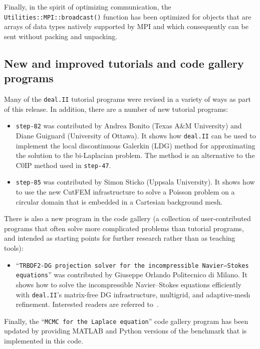 \documentclass{ansarticle-preprint}
\newcommand{\specialword}[1]{\texttt{#1}}
\newcommand{\dealii}{{\specialword{deal.II}}\xspace}
\begin{document}
Finally, in the spirit of optimizing communication, the
\texttt{Utilities::MPI::broadcast()} function has been optimized for
objects that are arrays of data types natively supported by MPI and
which consequently can be sent without packing and unpacking.





\subsection{New and improved tutorials and code gallery programs}
\label{subsec:steps}

Many of the \dealii{} tutorial programs were revised in a variety of
ways as part of this release. In addition, there are a number of new tutorial programs:
\begin{itemize}
\item \texttt{step-82} was contributed by Andrea Bonito (Texas A\&M University) and Diane Guignard (University of Ottawa). It shows how
\dealii{} can be used to implement the
local discontinuous Galerkin (LDG) method for approximating the
solution to the bi-Laplacian problem. The method is an alternative to
the C0IP method used in \texttt{step-47}.

\item \texttt{step-85} was contributed by Simon Sticko (Uppsala University). It shows how to use the new CutFEM infrastructure to solve a Poisson
problem on a circular domain that is embedded in a Cartesian background mesh.
\end{itemize}

There is also a new program in the code gallery (a collection of
user-contributed programs that often solve more complicated problems
than tutorial programs, and intended as starting points for further
research rather than as teaching tools):
\begin{itemize}
  \item ``\texttt{TRBDF2-DG projection solver for the incompressible Navier--Stokes equations}'' was contributed by Giuseppe Orlando Politecnico di Milano. It shows
  how to solve the incompressible Navier--Stokes equations efficiently 
  with \texttt{deal.II}'s matrix-free DG infrastructure, multigrid, and adaptive-mesh
  refinement. Interested readers are referred to~\cite{orlando2021efficient}.
\end{itemize}
Finally, the ``\texttt{MCMC for the Laplace equation}'' code gallery
program has been updated by providing MATLAB and Python versions of
the benchmark that is implemented in this code.
\end{document}
